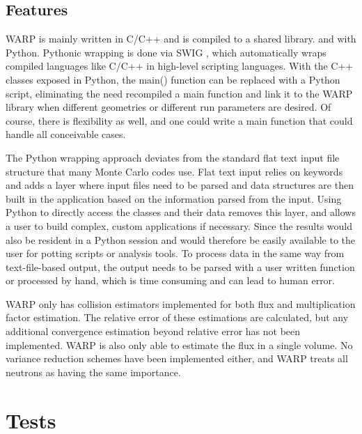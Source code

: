\documentclass[preprint,12pt]{elsarticle}
\begin{document}
\subsection{Features}

WARP is mainly written in C/C++ and is compiled to a shared library.   and  with Python.  Pythonic wrapping is done via SWIG \cite{swig}, which automatically wraps compiled languages like C/C++ in high-level scripting languages.  With the C++ classes exposed in Python, the main() function can be replaced with a Python script, eliminating the need recompiled a main function and link it to the WARP library when different geometries or different run parameters are desired.  Of course, there is flexibility as well, and one could write a main function that could handle all conceivable cases. 

The Python wrapping approach deviates from the standard flat text input file structure that many Monte Carlo codes use.  Flat text input relies on keywords and adds a layer where input files need to be parsed and data structures are then built in the application based on the information parsed from the input.  Using Python to directly access the classes and their data removes this layer, and allows a user to build complex, custom applications if necessary.  Since the results would also be resident in a Python session and would therefore be easily available to the user for potting scripts or analysis tools.  To process data in the same way from text-file-based output, the output needs to be parsed with a user written function or processed by hand, which is time consuming and can lead to human error.

WARP only has collision estimators implemented for both flux and multiplication factor estimation.  The relative error of these estimations are calculated, but any additional convergence estimation beyond relative error has not been implemented.  WARP is also only able to estimate the flux in a single volume.  No variance reduction schemes have been implemented either, and WARP treats all neutrons as having the same importance.

\newpage
\section{Tests}
\label{sec:tests}
\end{document}
